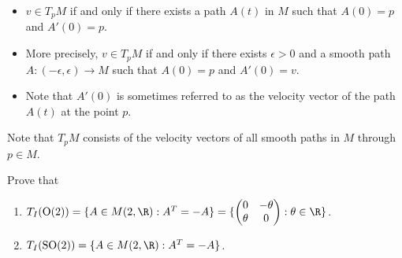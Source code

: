 \begin{itemize}
    \item \( v \in {T}_{p}M \) if and only if there exists a path \( A(t) \) in \( M  \) such that \( A(0)  = p \) and \( A'(0) = p \).
    \item More precisely, \( v \in {T}_{p}M \) if and only if there exists \( \epsilon > 0  \) and a smooth path \( A : (-\epsilon, \epsilon) \to M  \) such that \( A(0) = p \) and \( A'(0) = v \).
    \item Note that \( A'(0)  \) is sometimes referred to as the velocity vector of the path \( A(t) \) at the point \( p  \).
\end{itemize}

Note that \( {T}_{p}M \) consists of the velocity vectors of all smooth paths in \( M  \) through \( p \in M  \).

\begin{eg}
    Prove that 
    \begin{enumerate}
        \item[(1)] \( {T}_{I}(\text{O}(2)) = \{  A \in M(2, \R ) : A^{T} = - A  \}  = \{  \begin{pmatrix}  0 & - \theta  \\ \theta & 0  \end{pmatrix} : \theta \in \R   \}    \).
        \item[(2)] \( {T}_{I}(\text{SO}(2)) = \{ A \in M(2, \R) : A^{T} = - A  \}  \).
    \end{enumerate}
\end{eg}

